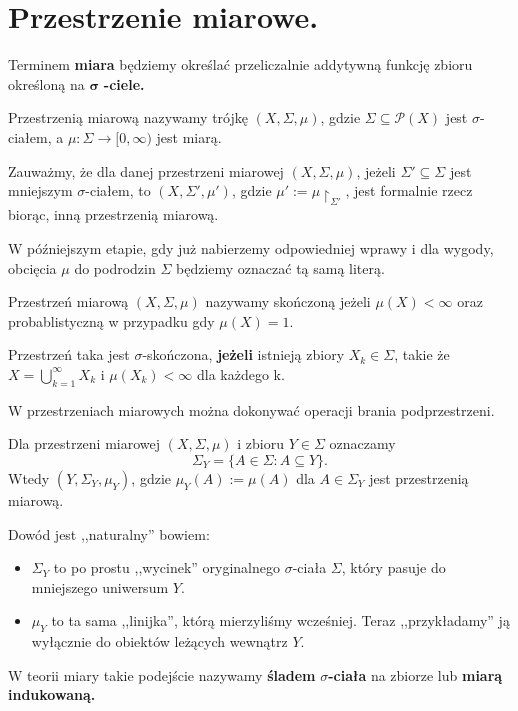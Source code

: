 \section{Przestrzenie miarowe.}
\begin{definition}[Miara]
	Terminem \textbf{miara} będziemy określać przeliczalnie addytywną funkcję zbioru określoną na $\bm{ \sigma  } $ \textbf{-ciele.} 
\end{definition} 

\begin{definition}
	Przestrzenią miarową nazywamy trójkę $\left( X, \Sigma, \mu \right) $, gdzie $\Sigma \subseteq \mathcal{P}(X) $ jest $\sigma$-ciałem, a $\mu: \Sigma \to [0,\infty)$ jest miarą. 
\end{definition} 
\begin{remark}
	Zauważmy, że dla danej przestrzeni miarowej $\left( X, \Sigma, \mu \right)$, jeżeli $\Sigma' \subseteq \Sigma$ jest mniejszym $\sigma $-ciałem, to $\left( X, \Sigma', \mu' \right) $, gdzie $\mu' := \mu\restriction_{\scriptscriptstyle \Sigma'}$, jest formalnie rzecz biorąc, inną przestrzenią miarową. 

	W późniejszym etapie, gdy już nabierzemy odpowiedniej wprawy i dla wygody, obcięcia $\mu$ do podrodzin $\Sigma $ będziemy oznaczać tą samą literą.
\end{remark} 
\begin{definition}
	Przestrzeń miarową $\left(X, \Sigma, \mu \right) $ nazywamy skończoną jeżeli $\mu\left( X \right) < \infty$ oraz probablistyczną w przypadku gdy $\mu\left( X \right) = 1$.

	Przestrzeń taka jest $\sigma$-skończona, \textbf{jeżeli} istnieją zbiory $X_{k} \in \Sigma$, takie że $X=\bigcup_{k=1} ^{\infty} X_{k}$ i $\mu\left( X_{k} \right) < \infty $ dla każdego k.
\end{definition} 

W przestrzeniach miarowych można dokonywać operacji brania podprzestrzeni.
\begin{theorem}
	Dla przestrzeni miarowej $\left( X, \Sigma, \mu \right) $ i zbioru $Y \in \Sigma$ oznaczamy
	\[
	\Sigma_{Y}= \{A \in \Sigma: A \subseteq Y\} 
	.\] 
	Wtedy $\left( Y, \Sigma_{Y}, \mu_{Y} \right)$, gdzie $\mu_{Y}\left( A \right) := \mu\left( A \right) $ dla $A\in \Sigma_{Y}$ jest przestrzenią miarową. 
\end{theorem} 
\noindent Dowód jest ,,naturalny'' bowiem:
	\begin{itemize}
		\item $\Sigma _{Y}$ to po prostu ,,wycinek'' oryginalnego $\sigma $-ciała $\Sigma $, który pasuje do mniejszego uniwersum $Y$.
		\item $\mu_{Y}$ to ta sama ,,linijka'', którą mierzyliśmy wcześniej. Teraz ,,przykładamy'' ją wyłącznie do obiektów leżących wewnątrz $Y$.
	\end{itemize}
W teorii miary takie podejście nazywamy \textbf{śladem} $\sigma $\textbf{-ciała} na zbiorze lub \textbf{miarą indukowaną.}

